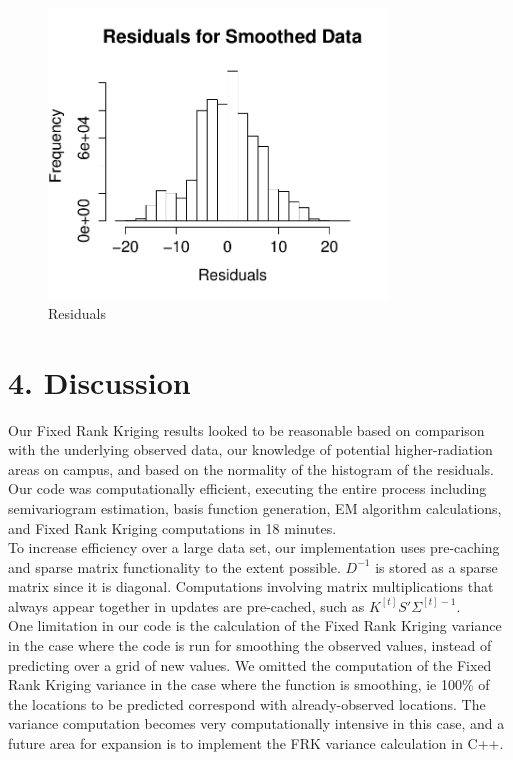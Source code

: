 \documentclass[11pt]{article}
\begin{document}
\begin{figure}[h!]
\centering
\includegraphics[width=90mm,keepaspectratio]{Images/Residuals_for_smoothing.pdf}
\caption{Residuals \label{fig:10}}
\end{figure}



\newpage
\section{4. Discussion}

Our Fixed Rank Kriging results looked to be reasonable based on comparison with the underlying observed data, our knowledge of potential higher-radiation areas on campus, and based on the normality of the histogram of the residuals.  Our code was computationally efficient, executing the entire process including semivariogram estimation, basis function generation, EM algorithm calculations, and Fixed Rank Kriging computations in 18 minutes.\\

To increase efficiency over a large data set, our implementation uses pre-caching and sparse matrix functionality to the extent possible.  $D^{-1}$ is stored as a sparse matrix since it is diagonal.  Computations involving matrix multiplications that always appear together in updates are pre-cached, such as $K^{[t]}S'\Sigma^{[t]-1}$.\\

One limitation in our code is the calculation of the Fixed Rank Kriging variance in the case where the code is run for smoothing the observed values, instead of predicting over a grid of new values.  We omitted the computation of the Fixed Rank Kriging variance in the case where the function is smoothing, ie 100\% of the locations to be predicted correspond with already-observed locations.  The variance computation becomes very computationally intensive in this case, and a future area for expansion is to implement the FRK variance calculation in C++.\\
\end{document}

